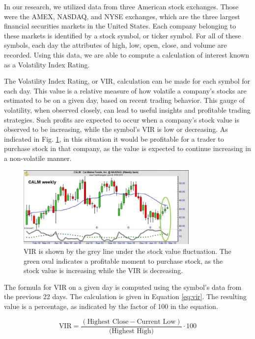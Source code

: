 \documentclass{IEEEtran}
\begin{document}
In our research, we utilized data from three American stock exchanges. Those were the AMEX, NASDAQ, and NYSE exchanges, which are the three largest financial securities markets in the United States. Each company belonging to these markets is identified by a stock symbol, or ticker symbol. For all of these symbols, each day the attributes of high, low, open, close, and volume are recorded. Using this data, we are able to compute a calculation of interest known as a Volatility Index Rating. 

The Volatility Index Rating, or VIR, calculation can be made for each symbol for each day. This value is a relative measure of how volatile a company’s stocks are estimated to be on a given day, based on recent trading behavior. This gauge of volatility, when observed closely, can lead to useful insights and profitable trading strategies. Such profits are expected to occur when a company's stock value is observed to be increasing, while the symbol’s VIR is low or decreasing. As indicated in Fig. \ref{fig:vir_example}, in this situation it would be profitable for a trader to purchase stock in that company, as the value is expected to continue increasing in a non-volatile manner. 

\begin{figure}
	\centering
	\includegraphics[width=3.5in]{Images/vir_example.png}
	\caption{VIR is shown by the grey line under the stock value fluctuation. The green oval indicates a profitable moment to purchase stock, as the stock value is increasing while the VIR is decreasing.}
	\label{fig:vir_example}
\end{figure}

The formula for VIR on a given day is computed using the symbol's data from the previous 22 days. The calculation is given in Equation \ref{eq:vir}. The resulting value is a percentage, as indicated by the factor of 100 in the equation. 

\begin{equation}
\text{VIR} = \frac{(\text{Highest Close} - \text{Current Low})}{\text{(Highest High)}} \cdot 100 \label{eq:vir}
\end{equation}
\end{document}
